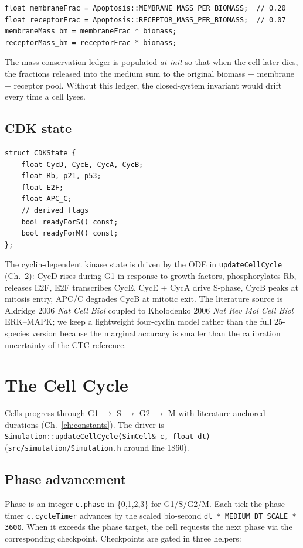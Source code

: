 \documentclass[11pt,letterpaper,twoside,openany]{book}
\newcommand{\code}[1]{\texttt{#1}}
\newcommand{\file}[1]{\texttt{\small#1}}
\begin{document}
\begin{lstlisting}
float membraneFrac = Apoptosis::MEMBRANE_MASS_PER_BIOMASS;  // 0.20
float receptorFrac = Apoptosis::RECEPTOR_MASS_PER_BIOMASS;  // 0.07
membraneMass_bm = membraneFrac * biomass;
receptorMass_bm = receptorFrac * biomass;
\end{lstlisting}
The mass-conservation ledger is populated \emph{at init} so that when
the cell later dies, the fractions released into the medium sum to
the original biomass + membrane + receptor pool. Without this ledger,
the closed-system invariant would drift every time a cell lyses.

\section{CDK state}

\begin{lstlisting}
struct CDKState {
    float CycD, CycE, CycA, CycB;
    float Rb, p21, p53;
    float E2F;
    float APC_C;
    // derived flags
    bool readyForS() const;
    bool readyForM() const;
};
\end{lstlisting}
The cyclin-dependent kinase state is driven by the ODE in
\code{updateCellCycle} (Ch.~\ref{ch:cycle}): CycD rises during G1 in
response to growth factors, phosphorylates Rb, releases E2F, E2F
transcribes CycE, CycE + CycA drive S-phase, CycB peaks at mitosis
entry, APC/C degrades CycB at mitotic exit. The literature source is
Aldridge 2006 \emph{Nat Cell Biol} coupled to Kholodenko 2006
\emph{Nat Rev Mol Cell Biol} ERK--MAPK; we keep a lightweight
four-cyclin model rather than the full 25-species version because
the marginal accuracy is smaller than the calibration uncertainty of
the CTC reference.

\chapter{The Cell Cycle}
\label{ch:cycle}

Cells progress through G1 \(\to\) S \(\to\) G2 \(\to\) M with
literature-anchored durations (Ch.~\ref{ch:constants}). The driver is
\code{Simulation::updateCellCycle(SimCell\& c, float dt)}
(\file{src/simulation/Simulation.h} around line 1860).

\section{Phase advancement}

Phase is an integer \code{c.phase} in \{0,1,2,3\} for G1/S/G2/M.
Each tick the phase timer \code{c.cycleTimer} advances by the scaled
bio-second \code{dt * \code{MEDIUM\_DT\_SCALE} * 3600}. When it exceeds
the phase target, the cell requests the next phase via the
corresponding checkpoint. Checkpoints are gated in three helpers:
\end{document}
